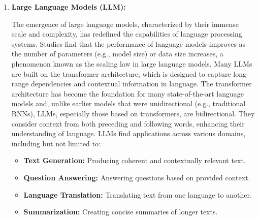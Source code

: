 \begin{enumerate}
{		      ELMo~\footnote{Embeddings from Language Models} (\textcite{elmo}) was one of the first PLMs, which used a bidirectional LSTM to generate word embeddings instead of learning fixed word representations.
		      \textcite{devlin2019bert} introduced BERT (Bidirectional Encoder Representations from Transformers), which is a transformer-based model that is pre-trained on a large corpus of text and then fine-tuned on specific tasks.
		      BERT was a significant advancement in the field of natural language processing, as it demonstrated the potential of pre-trained language models to achieve state-of-the-art performance on a wide range of tasks.
		      These studies introduced the \textit{"pre-training and fine-tuning"} paradigm, which has become a standard practice in the development of language models and inspired great number of models, such as GPT-2 (\textcite{radford2019language}), GPT-3 (\textcite{brown2020language}), T5 (\textcite{raffel2023exploring}), and many others.
	      }
	\item \textbf{Large Language Models (LLM):} {The emergence of large language models, characterized by their immense scale and complexity, has redefined the capabilities of language processing systems.
		      Studies find that the performance of language models improves as the number of parameters (e.g., model size) or data size increases, a phenomenon known as the scaling law in large language models.
		      Many LLMs are built on the transformer architecture, which is designed to capture long-range dependencies and contextual information in language.
		      The transformer architecture has become the foundation for many state-of-the-art language models and, unlike earlier models that were unidirectional (e.g., traditional RNNs), LLMs, especially those based on transformers, are bidirectional. They consider context from both preceding and following words, enhancing their understanding of language.
		      LLMs find applications across various domains, including but not limited to:
		      \begin{itemize}
			      \item \textbf{Text Generation:} Producing coherent and contextually relevant text.
			      \item \textbf{Question Answering:} Answering questions based on provided context.
			      \item \textbf{Language Translation:} Translating text from one language to another.
			      \item \textbf{Summarization:} Creating concise summaries of longer texts.

\end{itemize}}
\end{enumerate}
